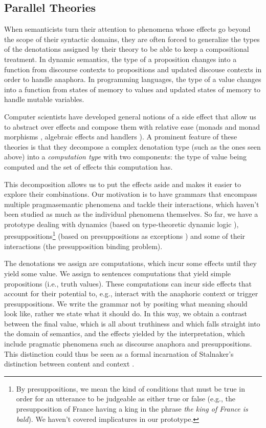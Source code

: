\documentclass[a4paper,11pt,DIV=12]{scrartcl}
\begin{document}
\subsection{Parallel Theories}

When semanticists turn their attention to phenomena whose effects go beyond
the scope of their syntactic domains, they are often forced to generalize
the types of the denotations assigned by their theory to be able to keep a
compositional treatment. In dynamic semantics, the type of a proposition
changes into a function from discourse contexts to propositions and updated
discouse contexts in order to handle anaphora. In programming languages,
the type of a value changes into a function from states of memory to values
and updated states of memory to handle mutable variables.

Computer scientists have developed general notions of a side effect that
allow us to abstract over effects and compose them with relative ease
(monads and monad morphisms \cite{moggi1990abstract}, algebraic effects and
handlers \cite{plotkin2013handling}). A prominent feature of these theories
is that they decompose a complex denotation type (such as the ones seen
above) into a \emph{computation type} with two components: the type of
value being computed and the set of effects this computation has.

This decomposition allows us to put the effects aside and makes it easier
to explore their combinations. Our motivation is to have grammars that
encompass multiple pragmasemantic phenomena and tackle their interactions,
which haven't been studied as much as the individual phenomena themselves.
So far, we have a prototype dealing with dynamics (based on type-theoretic
dynamic logic \cite{de2006towards}), presuppositions\footnote{By
  presuppositions, we mean the kind of conditions that must be true in
  order for an utterance to be judgeable as either true or false (e.g., the
  presupposition of France having a king in the phrase \emph{the king of
    France is bald}). We haven't covered implicatures in our prototype.}
(based on presuppositions as exceptions \cite{lebedeva2012expression}) and
some of their interactions (the presupposition binding problem).

The denotations we assign are computations, which incur some effects until
they yield some value. We assign to sentences computations that yield
simple propositions (i.e., truth values). These computations can incur side
effects that account for their potential to, e.g., interact with the
anaphoric context or trigger presuppositions. We write the grammar not by
positing what meaning should look like, rather we state what it should
do. In this way, we obtain a contrast between the final value, which is all
about truthiness and which falls straight into the domain of semantics, and
the effects yielded by the interpretation, which include pragmatic
phenomena such as discourse anaphora and presuppositions. This distinction
could thus be seen as a formal incarnation of Stalnaker's distinction
between content and context \cite{stalnaker1974pragmatic}.



\end{document}
